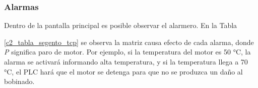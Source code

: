 \subsubsection{Alarmas}
Dentro de la pantalla principal es posible observar el alarmero. En la Tabla {\ref{c2_tabla_segento_tcp} se observa la matriz causa efecto de cada alarma, donde \textit{P} significa paro de motor.  Por ejemplo, si la temperatura del motor es 50 °C, la alarma se activará informando alta temperatura, y si la temperatura llega a 70 °C, el PLC hará que el motor se detenga para que no se produzca un daño al bobinado.

	\begin{table}[h!]
	\centering
\end{table}}
